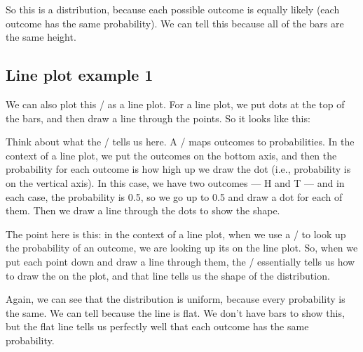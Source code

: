 \documentclass[../../../main.tex]{subfiles}
\begin{document}
So this is a  distribution, because each possible outcome is equally likely (each outcome has the same probability). We can tell this because all of the bars are the same height.


\subsection{Line plot example 1}

We can also plot this \PDFtext/ as a line plot. For a line plot, we put dots at the top of the bars, and then draw a line through the points. So it looks like this:

\begin{center}
\end{center}

\noindent
Think about what the \PDFtext/ tells us here. A \PDFtext/ maps outcomes to probabilities. In the context of a line plot, we put the outcomes on the bottom axis, and then the probability for each outcome is how high up we draw the dot (i.e., probability is on the vertical axis). In this case, we have two outcomes --- H and T --- and in each case, the probability is 0.5, so we go up to 0.5 and draw a dot for each of them. Then we draw a line through the dots to show the shape.

The point here is this: in the context of a line plot, when we use a \PDFtext/ to look up the probability of an outcome, we are looking up its  on the line plot. So, when we put each point down and draw a line through them, the \PDFtext/ essentially tells us how to draw the  on the plot, and that line tells us the shape of the distribution.

Again, we can see that the distribution is uniform, because every probability is the same. We can tell because the line is flat. We don't have bars to show this, but the flat line tells us perfectly well that each outcome has the same probability.
\end{document}
